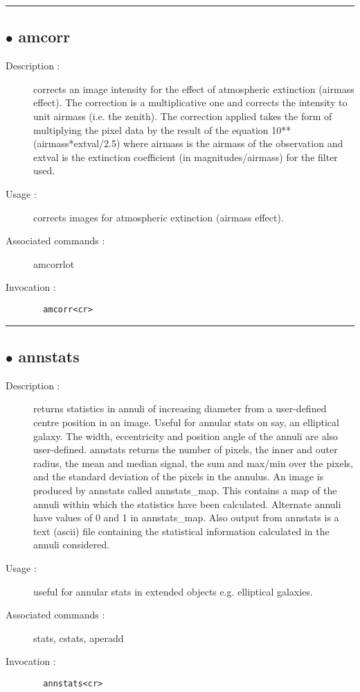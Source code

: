 \hrule \subsection*{$\bullet$ amcorr}
\begin{description}
\item[Description :] corrects an image intensity for the effect of atmospheric
extinction (airmass effect).  The correction is a multiplicative one and
corrects the intensity to unit airmass (i.e. the zenith).  The correction
applied takes the form of multiplying the pixel data by the result of the
equation 10**(airmass*extval/2.5) where airmass is the airmass of the
observation and extval is the extinction coefficient (in
magnitudes/airmass) for the filter used.
\item[Usage :] corrects images for atmospheric extinction (airmass effect).
\item[Associated commands :] amcorrlot
\item[Invocation :]

\verb+  amcorr<cr> +\end{description}

\hrule \subsection*{$\bullet$ annstats}
\begin{description}
\item[Description :] returns statistics in annuli of increasing diameter from a
user-defined centre position in an image.  Useful for annular stats on
say, an elliptical galaxy.  The width, eccentricity and position angle of
the annuli are also user-defined.  annstats returns the number of pixels,
the inner and outer radius, the mean and median signal, the sum and
max/min over the pixels, and the standard deviation of the pixels in the
annulus. An image is produced by annstats called annstats\_map.  This
contains a map of the annuli within which the statistics have been
calculated. Alternate annuli have values of 0 and 1 in annstats\_map. Also
output from annstats is a text (ascii) file containing the statistical
information calculated in the annuli considered.
\item[Usage :] useful for annular stats in extended objects e.g. elliptical
galaxies.
\item[Associated commands :] stats, cstats, aperadd
\item[Invocation :]

\verb+  annstats<cr> +\end{description}

